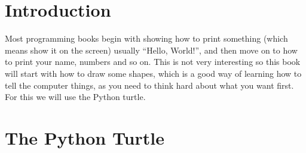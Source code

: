 \documentclass[a4paper, 11pt]{book}
\begin{document}
\section{Introduction}

Most programming books begin with showing how to print something (which means show it on the screen) usually ``Hello, World!'', and then move on to how to print your name, numbers and so on. This is not very interesting so this book will start with how to draw some shapes, which is a good way of learning how to tell the computer things, as you need to think hard about what you want first. For this we will use the Python turtle.

\section{The Python Turtle}
\end{document}
